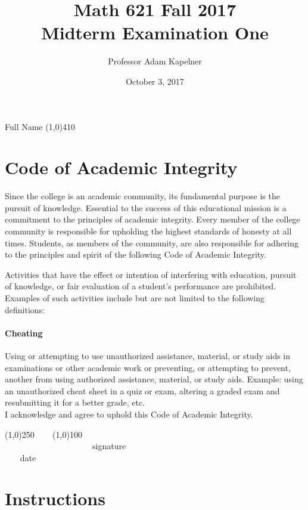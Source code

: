 \documentclass[12pt]{article}
\title{Math 621 Fall 2017 \\ Midterm Examination One}
\author{Professor Adam Kapelner}
\date{October 3, 2017}
\begin{document}
\maketitle

\noindent Full Name \line(1,0){410}

\thispagestyle{empty}

\section*{Code of Academic Integrity}

\footnotesize
Since the college is an academic community, its fundamental purpose is the pursuit of knowledge. Essential to the success of this educational mission is a commitment to the principles of academic integrity. Every member of the college community is responsible for upholding the highest standards of honesty at all times. Students, as members of the community, are also responsible for adhering to the principles and spirit of the following Code of Academic Integrity.

Activities that have the effect or intention of interfering with education, pursuit of knowledge, or fair evaluation of a student's performance are prohibited. Examples of such activities include but are not limited to the following definitions:

\paragraph{Cheating} Using or attempting to use unauthorized assistance, material, or study aids in examinations or other academic work or preventing, or attempting to prevent, another from using authorized assistance, material, or study aids. Example: using an unauthorized cheat sheet in a quiz or exam, altering a graded exam and resubmitting it for a better grade, etc.
\\

\noindent I acknowledge and agree to uphold this Code of Academic Integrity. \\

\begin{center}
\line(1,0){250} ~~~ \line(1,0){100}\\
~~~~~~~~~~~~~~~~~~~~~signature~~~~~~~~~~~~~~~~~~~~~~~~~~~~~~~~~~~~~~~~~~~~~ date
\end{center}

\normalsize

\section*{Instructions}
\end{document}
